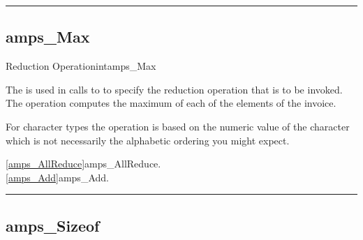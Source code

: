 
\noindent\rule{\textwidth}{1mm}

\subsection{amps\_Max}
\label{amps_Max}

\begin{deftypevr}{Reduction Operation}{int}{amps\_Max}
\DESCRIPTION

The  is used in calls to  to
specify the reduction operation that is to be invoked.  The 
operation computes the maximum of each of the elements of the
invoice.

\NOTES
For character types the  operation is based on the numeric
value of the character which is not necessarily the alphabetic ordering
you might expect.

\SEEALSO
\vref{amps_AllReduce}{amps\_AllReduce}. \\
\vref{amps_Add}{amps\_Add}. \\

\end{deftypevr}


\noindent\rule{\textwidth}{1mm}

\subsection{amps\_Sizeof}
\label{amps_SizeofType}

